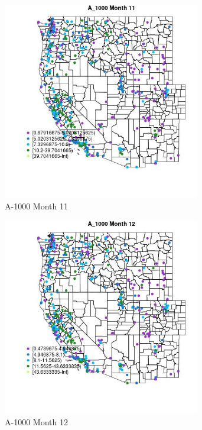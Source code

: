 \begin{figure} 
\centering  
\includegraphics[width=0.77\textwidth]{Code_Outputs/ML_input_report_ML_input_PM25_Step5_part_d_de_duplicated_aves_ML_input_MapObsMo11A_1000.jpg} 
\caption{\label{fig:ML_input_report_ML_input_PM25_Step5_part_d_de_duplicated_aves_ML_inputMapObsMo11A_1000}A-1000 Month 11} 
\end{figure} 
 

\begin{figure} 
\centering  
\includegraphics[width=0.77\textwidth]{Code_Outputs/ML_input_report_ML_input_PM25_Step5_part_d_de_duplicated_aves_ML_input_MapObsMo12A_1000.jpg} 
\caption{\label{fig:ML_input_report_ML_input_PM25_Step5_part_d_de_duplicated_aves_ML_inputMapObsMo12A_1000}A-1000 Month 12} 
\end{figure} 
 

